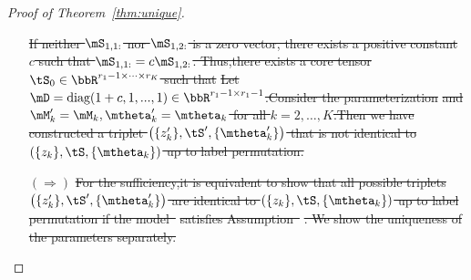 \documentclass[lettersize,onecolumn,journal]{IEEEtran}
\theoremstyle{definition}
\theoremstyle{definition}
\newcommand{\of}[1]{\left(#1\right)}
\providecommand{\DIFdeltex}[1]{{\protect\color{red}\sout{#1}}}                      %
\providecommand{\DIFdel}[1]{\texorpdfstring{\DIFdeltex{#1}}{}} %
\begin{document}
\begin{proof}[Proof of Theorem~\ref{thm:unique}]
\begin{enumerate}[wide]
\DIFdel{If neither $\mS_{1,1:}$ nor $\mS_{1,2:}$ is a zero vector, there exists a positive constant $c$ such that $\mS_{1,1:} = c \mS_{1,2:}$. Thus,there exists a core tensor $\tS_0 \in \bbR^{r_1 -1 \times \cdots \times r_K}$ such that 
}%
\DIFdel{Let $\mD = \text{diag}(1+c, 1,...,1) \in \bbR^{r_1 -1 \times r_1 -1}$.Consider the parameterization
}%
\DIFdel{and $\mM'_k = \mM_k, \mtheta'_k = \mtheta_k$ for all $k = 2, \ldots, K$.Then we have constructed a
triplet $\of{ \{z'_k\}, \tS', \{ \mtheta'_k \} }$ that is not identical to $\of{ \{z_k\}, \tS, \{ \mtheta_k \} }$ up to label permutation.}%

\item[\DIFdel{$(\Rightarrow)$}]%
\DIFdel{For the sufficiency,it is equivalent to show that all possible triplets $\of{ \{z'_k\}, \tS', \{ \mtheta'_k \} }$ are identical to $\of{ \{z_k\}, \tS, \{ \mtheta_k \} }$ up to label permutation if the model~}%
\DIFdel{satisfies Assumption~}%
\DIFdel{. We show the uniqueness of the parameters separately.
}%



\end{enumerate}
\end{proof}
\end{document}
